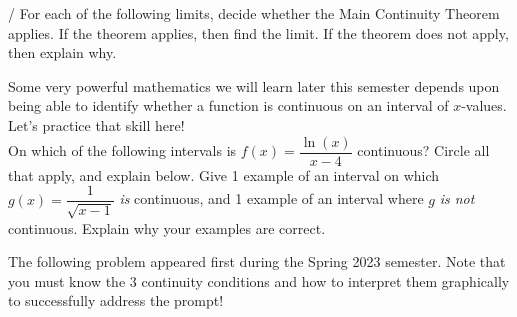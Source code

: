 \documentclass[10pt]{article}
\begin{document}
/  For each of the following limits, decide whether the Main Continuity Theorem applies. If the theorem applies, then find the limit. If the theorem does not apply, then explain why.

{}

\newpage

 Some very powerful mathematics we will learn later this semester depends upon being able to identify whether a function is continuous on an interval of $x$-values. Let's practice that skill here!\\

On which of the following intervals is $f(x)=\dfrac{\ln(x)}{x-4}$ continuous? Circle all that apply, and explain below.
\vfill
{} Give 1 example of an interval on which $g(x)=\dfrac{1}{\sqrt{x-1}}$ {\em is} continuous, and 1 example of an interval where $g$  {\em is not} continuous.   Explain why your examples are correct.
\vfill



\newpage
The following problem appeared first during the Spring 2023 semester. Note that you must know the 3 continuity conditions and how to interpret them graphically to successfully address the prompt!\\
\end{document}
